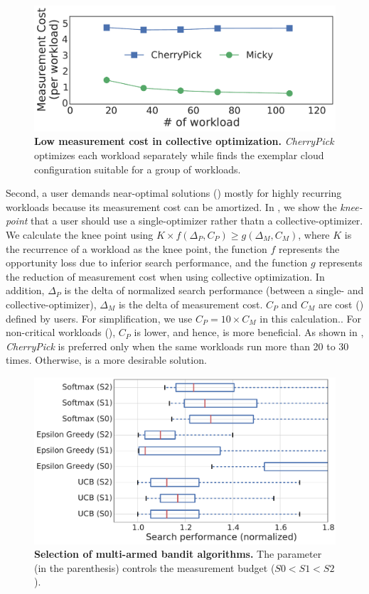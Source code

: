 \begin{figure}[!htbp]
 \includegraphics[width=.8\textwidth]{Figures/s0_single_time_steps_comparison.pdf}
 \centering
 \caption{\textbf{Low measurement cost in collective optimization.} \emph{CherryPick} optimizes each workload separately while \micky finds the exemplar cloud configuration suitable for a group of workloads.}
 \label{fig:cost_saving}
\end{figure}

Second, a user demands near-optimal solutions ()
mostly for highly recurring workloads because its measurement cost can be amortized.
In \mytable{\ref{table:break_even_cost}}, we show the \textit{knee-point} that a user should use a single-optimizer rather thatn a collective-optimizer.
We calculate the knee point using
$K \times f(\Delta_{P}, C_{P}) \ge g(\Delta_{M}, C_{M})$,
where $K$ is the recurrence of a workload as the knee point,
the function $f$ represents the opportunity loss due to inferior search performance, and
the function $g$ represents the reduction of measurement cost when using collective optimization.
In addition, 
$\Delta_{P}$ is the delta of normalized search performance (between a single- and collective-optimizer),
$\Delta_{M}$ is the delta of measurement cost.
$C_{P}$ and $C_{M}$ are cost () defined by users.
For simplification, we use $C_{P} = 10 \times C_{M}$ in this calculation..
For non-critical workloads (),
$C_{P}$ is lower, and hence, \micky is more beneficial.
As shown in \mytable{\ref{table:break_even_cost}},
\emph{CherryPick} is preferred only when
the same workloads run more than 20 to 30 times.
Otherwise, \micky is a more desirable solution.




\begin{figure}[!htbp]
 \includegraphics[width=.8\textwidth]{Figures/s0_single_algorithm_selection.pdf}
 \centering
 \caption{\textbf{Selection of multi-armed bandit algorithms.} The parameter (in the parenthesis) controls the measurement budget ($S0 < S1 < S2$).}
 \label{fig:algorithm_selection}
\end{figure}

